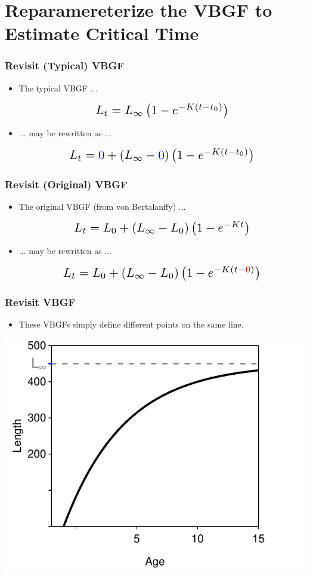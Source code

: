 \documentclass[xcolor=dvipsnames,t]{beamer}\usepackage[]{graphicx}\usepackage[]{color}
\makeatletter
\newenvironment{knitrout}{}{} %
\newcommand*{\Scale}[2][4]{\scalebox{#1}{\ensuremath{#2}}}%
\def\mathcolor#1#{\@mathcolor{#1}}
\def\@mathcolor#1#2#3{%
  \protect\leavevmode
  \begingroup
    \color#1{#2}#3%
  \endgroup
}
\makeatother
\begin{document}
\section{Reparamereterize the VBGF to Estimate Critical Time}


\begin{frame}[fragile]
\frametitle{Revisit (Typical) VBGF}
\begin{itemize}
\item The typical VBGF ...

\[\Scale[1.5]{ L_{t} = L_{\infty}\left(1-e^{-K(t-t_{0})}\right) }\]

\pause
\bigskip
\item ... may be rewritten as ...

\[\Scale[1.5]{ L_{t} = \mathcolor{blue}{0} + (L_{\infty}-\mathcolor{blue}{0})\left(1-e^{-K(t-t_{0})}\right) }\]
\end{itemize}
\end{frame}


\begin{frame}[fragile]
\frametitle{Revisit (Original) VBGF}
\begin{itemize}
\item The original VBGF (from von Bertalanffy) ...

\[\Scale[1.5]{ L_{t} = L_{0} + (L_{\infty}-L_{0})\left(1-e^{-Kt}\right) }\]

\pause
\bigskip
\item ... may be rewritten as ...

\[\Scale[1.5]{ L_{t} = L_{0} + (L_{\infty}-L_{0})\left(1-e^{-K(t-\mathcolor{red}{0})}\right) }\]
\end{itemize}
\end{frame}


\begin{frame}[fragile]
\frametitle{Revisit VBGF}
\vspace{-12pt}
\begin{itemize}
  \item These VBGFs simply define different points on the same line.
\end{itemize}
\smallskip
\begin{knitrout}\footnotesize
{}\color{fgcolor}

{\centering \includegraphics[width=.5\linewidth]{Figs/pointsOnLineNULL-1} 

}



\end{knitrout}
\end{frame}
\end{document}
